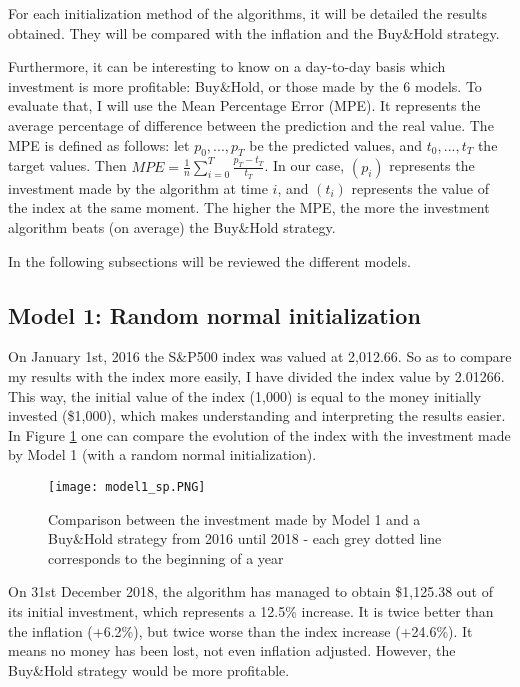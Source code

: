 \documentclass[11pt]{article}
\begin{document}
\begin{onehalfspace}
For each initialization method of the algorithms, it will be detailed the results obtained. They will be compared with the inflation and the Buy\&Hold strategy.

Furthermore, it can be interesting to know on a day-to-day basis which investment is more profitable: Buy\&Hold, or those made by the 6 models. To evaluate that, I will use the Mean Percentage Error (MPE). It represents the average percentage of difference between the prediction and the real value. The MPE is defined as follows: let $p_0,...,p_T$ be the predicted values, and $t_0,...,t_T$ the target values. Then $MPE = \frac{1}{n} \sum\limits_{i=0}^{T} \frac{p_T - t_T}{t_T}$. In our case, $(p_i)$ represents the investment made by the algorithm at time $i$, and $(t_i)$ represents the value of the index at the same moment. The higher the MPE, the more the investment algorithm beats (on average) the Buy\&Hold strategy.

In the following subsections will be reviewed the different models.

\subsection{Model 1: Random normal initialization}

On January 1st, 2016 the S\&P500 index was valued at 2,012.66. So as to compare my results with the index more easily, I have divided the index value by 2.01266. This way, the initial value of the index (1,000) is equal to the money initially invested (\$1,000), which makes understanding and interpreting the results easier. In Figure \ref{fig:plot_model1} one can compare the evolution of the index with the investment made by Model 1 (with a random normal initialization).

\begin{figure}[h!]
     \centering
     \texttt{[image: model1\_sp.PNG]}
     \caption{Comparison between the investment made by Model 1 and a Buy\&Hold strategy from 2016 until 2018 - each grey dotted line corresponds to the beginning of a year}
\label{fig:plot_model1}
\end{figure}

On 31st December 2018, the algorithm has managed to obtain \$1,125.38 out of its initial investment, which represents a 12.5\% increase. It is twice better than the inflation (+6.2\%), but twice worse than the index increase (+24.6\%). It means no money has been lost, not even inflation adjusted. However, the Buy\&Hold strategy would be more profitable. 


\end{onehalfspace}
\end{document}
